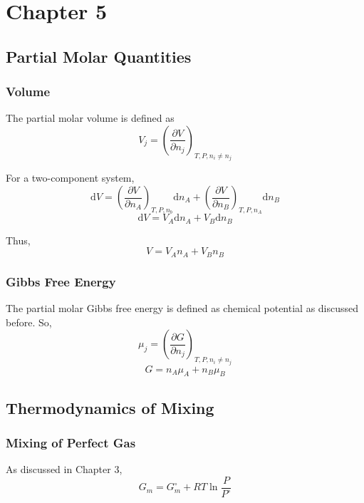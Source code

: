 \documentclass[letterpaper]{article}
\newcommand{\diff}{\mathrm{d}}
\newcommand{\zero}{^\circ}
\begin{document}
\newpage
\section*{Chapter 5}
\subsection*{Partial Molar Quantities}
\subsubsection*{Volume}
The partial molar volume is defined as
\begin{equation*}
    V_j=(\frac{\partial V}{\partial n_j})_{T,P,n_i\neq n_j}
\end{equation*}

For a two-component system,
\begin{equation*}
    \diff V=(\frac{\partial V}{\partial n_A})_{T,P,n_b}\diff n_A
    +(\frac{\partial V}{\partial n_B})_{T,P,n_A}\diff n_B
\end{equation*}
\begin{equation*}
    \diff V=V_A\diff n_A+V_B\diff n_B
\end{equation*}

Thus,
\begin{equation*}
    V=V_An_A+V_Bn_B
\end{equation*}
\subsubsection*{Gibbs Free Energy}
The partial molar Gibbs free energy is defined as chemical potential as discussed before.
So,
\begin{equation*}
    \mu_j=(\frac{\partial G}{\partial n_j})_{T,P,n_i\neq n_j}
\end{equation*}
\begin{equation*}
    G=n_A\mu_A+n_B\mu_B
\end{equation*}
\subsection*{Thermodynamics of Mixing}
\subsubsection*{Mixing of Perfect Gas}
As discussed in Chapter 3,
\begin{equation*}
    G_m=G_m\zero+RT\ln\frac{P}{P\zero}
\end{equation*}
\end{document}
